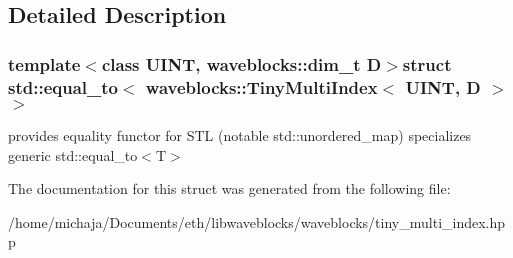 \subsection{Detailed Description}
\subsubsection*{template$<$class U\+I\+N\+T, waveblocks\+::dim\+\_\+t D$>$struct std\+::equal\+\_\+to$<$ waveblocks\+::\+Tiny\+Multi\+Index$<$ U\+I\+N\+T, D $>$ $>$}

provides equality functor for S\+T\+L (notable std\+::unordered\+\_\+map) specializes generic std\+::equal\+\_\+to$<$\+T$>$ 

The documentation for this struct was generated from the following file\+:\begin{DoxyCompactItemize}
\item 
/home/michaja/\+Documents/eth/libwaveblocks/waveblocks/tiny\+\_\+multi\+\_\+index.\+hpp\end{DoxyCompactItemize}
